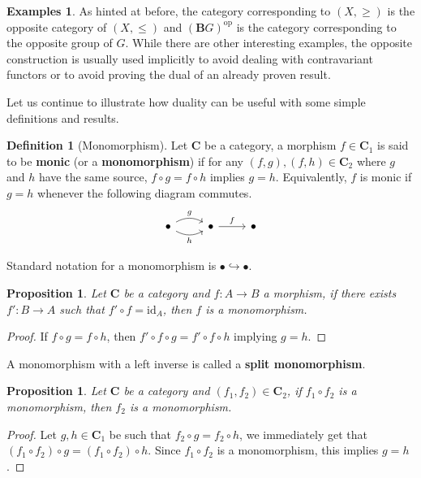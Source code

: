 \documentclass{article}
\newtheorem{prop}[thm]{Proposition}
\theoremstyle{definition}
\newtheorem{defn}[thm]{Definition}
\newtheorem{exmps}[thm]{Examples}
\theoremstyle{remark}
\newcommand{\id}{\text{id}}
\newcommand{\op}[1]{#1^{\text{op}}}
\begin{document}
\begin{exmps}
	As hinted at before, the category corresponding to $(X, \geq)$ is the opposite category of $(X, \leq)$ and $\op{(\mathbf{B}G)}$ is the category corresponding to the opposite group of $G$. While there are other interesting examples, the opposite construction is usually used implicitly to avoid dealing with contravariant functors or to avoid proving the dual of an already proven result.
	
\end{exmps}


Let us continue to illustrate how duality can be useful with some simple definitions and results.
\begin{defn}[Monomorphism]
	Let $\mathbf{C}$ be a category, a morphism $f \in \mathbf{C}_1$ is said to be \textbf{monic} (or a \textbf{monomorphism}) if for any $(f,g), (f,h) \in \mathbf{C}_2$ where $g$ and $h$ have the same source, $f\circ g = f\circ h$ implies $g = h$. Equivalently, $f$ is monic if $g = h$ whenever the following diagram commutes.
	\begin{equation}
		\begin{tikzcd}
		\bullet \arrow[r, "h"', bend right] \arrow[r, "g", bend left] & \bullet \arrow[r, "f"] & \bullet
		\end{tikzcd}
	\end{equation}
	
	Standard notation for a monomorphism is $ \bullet \hookrightarrow \bullet $.
\end{defn}
\begin{prop}\label{propmon1}
	Let $\mathbf{C}$ be a category and $f:A\rightarrow B$ a morphism, if there exists $f': B\rightarrow A$ such that $f'\circ f = \id_A$, then $f$ is a monomorphism.
\end{prop}
\begin{proof}
	If $f\circ g = f\circ h$, then $f'\circ f \circ g = f'\circ f \circ h$ implying $g = h$.
\end{proof}
A monomorphism with a left inverse is called a \textbf{split monomorphism}.
\begin{prop}\label{propmon2}
	Let $\mathbf{C}$ be a category and $(f_1, f_2) \in \mathbf{C}_2$, if $f_1 \circ f_2$ is a monomorphism, then $f_2$ is a monomorphism.
\end{prop}
\begin{proof}
	Let $g,h \in \mathbf{C}_1$ be such that $f_2\circ g = f_2\circ h$, we immediately get that $(f_1\circ f_2)\circ g = (f_1 \circ f_2) \circ h$. Since $f_1\circ f_2$ is a monomorphism, this implies $g = h$.
\end{proof}
\end{document}
